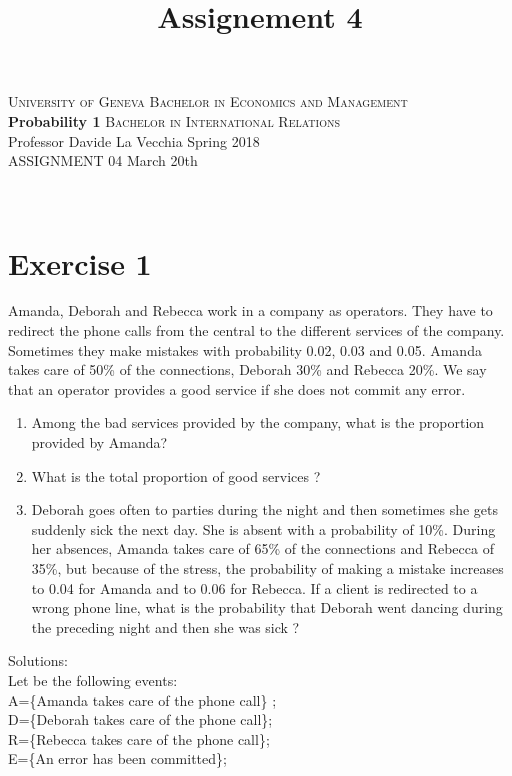 \documentclass[12pt,thmsa]{article}
\title{Assignement 4}
\begin{document}
\noindent \textsc{University of Geneva}     \hfill \textsc{Bachelor in Economics and Management} \\
\textbf{Probability 1}                      \hfill \textsc{Bachelor in International Relations} \\
Professor Davide La Vecchia                 \hfill Spring 2018  \\
ASSIGNMENT 04                               \hfill   March 20th



\noindent
\makebox[\linewidth]{\rule{\textwidth}{0.4pt}}\\[1.5ex]

\section*{Exercise 1}

Amanda, Deborah and Rebecca work in a company as operators. They have to redirect the phone calls from the central to the different services of the company. Sometimes they make mistakes with
probability 0.02, 0.03 and 0.05. Amanda takes care of 50\% of the connections, Deborah 30\% and Rebecca 20\%. We say that an operator provides a good service if she does not commit any error.

\begin{enumerate}
  \item Among the bad services provided by the company, what is the proportion provided by Amanda?
  \item What is the total proportion of good services ?
  \item 
  Deborah goes often to parties during the night and then sometimes she gets suddenly sick the next day. She is absent with a probability of 10\%.
  During her absences, Amanda takes care of 65\% of the connections and Rebecca of 35\%, but because of the stress, the probability of making a mistake
  increases to 0.04 for Amanda and to 0.06 for Rebecca. If a client is redirected to a wrong phone line, what is the probability that Deborah went dancing during the preceding night and then she was sick ?
\end{enumerate}

\noindent Solutions:\\
Let be the following events: \\
A=\{Amanda takes care of the phone call\} ; \\
D=\{Deborah takes care of the phone call\}; \\
R=\{Rebecca takes care of the phone call\}; \\
E=\{An error has been committed\}; \\
\end{document}
